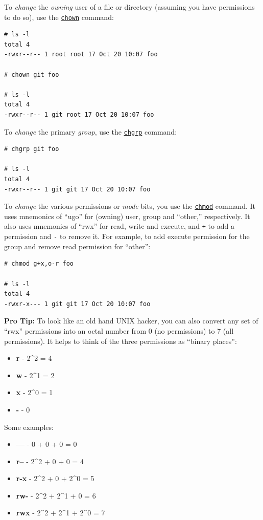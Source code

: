\documentclass[10pt,]{book}
\numberwithin{figure}{chapter}
\begin{document}
To \emph{change} the \emph{owning} user of a file or directory (assuming
you have permissions to do so), use the
\href{http://linux.die.net/man/1/chown}{\texttt{chown}} command:

\begin{verbatim}
# ls -l
total 4
-rwxr--r-- 1 root root 17 Oct 20 10:07 foo

# chown git foo

# ls -l
total 4
-rwxr--r-- 1 git root 17 Oct 20 10:07 foo
\end{verbatim}

To \emph{change} the primary \emph{group}, use the
\href{http://linux.die.net/man/1/chgrp}{\texttt{chgrp}} command:

\begin{verbatim}
# chgrp git foo

# ls -l
total 4
-rwxr--r-- 1 git git 17 Oct 20 10:07 foo
\end{verbatim}

To \emph{change} the various permissions or \emph{mode} bits, you use
the \href{http://linux.die.net/man/1/chmod}{\texttt{chmod}} command. It
uses mnemonics of ``ugo'' for (owning) user, group and ``other,''
respectively. It also uses mnemonics of ``rwx'' for read, write and
execute, and \texttt{+} to add a permission and \texttt{-} to remove it.
For example, to add execute permission for the group and remove read
permission for ``other'':

\begin{verbatim}
# chmod g+x,o-r foo

# ls -l
total 4
-rwxr-x--- 1 git git 17 Oct 20 10:07 foo
\end{verbatim}

\textbf{Pro Tip:} To look like an old hand UNIX hacker, you can also
convert any set of ``rwx'' permissions into an octal number from 0 (no
permissions) to 7 (all permissions). It helps to think of the three
permissions as ``binary places'':

\begin{itemize}
\itemsep1pt\parskip0pt
\item
  \textbf{r} - 2\^{}2 = 4
\item
  \textbf{w} - 2\^{}1 = 2
\item
  \textbf{x} - 2\^{}0 = 1
\item
  \textbf{-} - 0
\end{itemize}

Some examples:

\begin{itemize}
\itemsep1pt\parskip0pt
\item
  \textbf{---} - 0 + 0 + 0 = 0
\item
  \textbf{r--} - 2\^{}2 + 0 + 0 = 4
\item
  \textbf{r-x} - 2\^{}2 + 0 + 2\^{}0 = 5
\item
  \textbf{rw-} - 2\^{}2 + 2\^{}1 + 0 = 6
\item
  \textbf{rwx} - 2\^{}2 + 2\^{}1 + 2\^{}0 = 7
\end{itemize}
\end{document}
